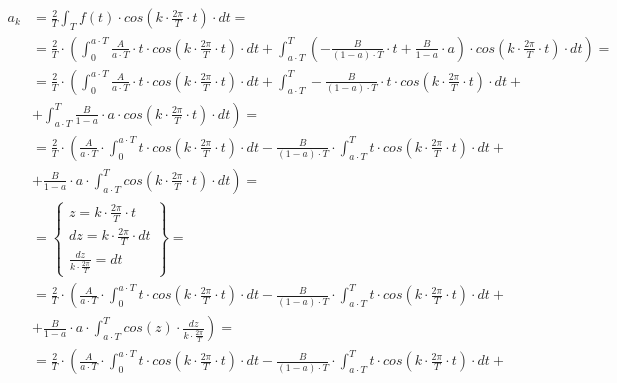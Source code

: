 \begin{task}
\begin{align*}
a_k&=\frac{2}{T}\int_{T}f(t) \cdot cos\left( k \cdot \frac{2\pi}{T} \cdot t\right) \cdot dt=\\
&=\frac{2}{T}\cdot\left(\int_{0}^{a\cdot T} \frac{A}{a \cdot T} \cdot t \cdot cos\left( k \cdot \frac{2\pi}{T} \cdot t\right) \cdot dt+\int_{a \cdot T}^{T} \left(-\frac{B}{\left(1-a\right)\cdot T}\cdot t + \frac{B}{1-a}\cdot a\right) \cdot cos\left( k \cdot \frac{2\pi}{T} \cdot t\right) \cdot dt\right)=\\
&=\frac{2}{T}\cdot\left(\int_{0}^{a\cdot T} \frac{A}{a \cdot T} \cdot t \cdot cos\left( k \cdot \frac{2\pi}{T} \cdot t\right) \cdot dt+\int_{a \cdot T}^{T} -\frac{B}{\left(1-a\right)\cdot T}\cdot t \cdot cos\left( k \cdot \frac{2\pi}{T} \cdot t\right) \cdot dt \right. +\\
&+\left. \int_{a \cdot T}^{T} \frac{B}{1-a}\cdot a \cdot cos\left( k \cdot \frac{2\pi}{T} \cdot t\right) \cdot dt\right)=\\
&=\frac{2}{T}\cdot\left( \frac{A}{a \cdot T} \cdot \int_{0}^{a\cdot T} t \cdot cos\left( k \cdot \frac{2\pi}{T} \cdot t\right) \cdot dt -\frac{B}{\left(1-a\right)\cdot T}\cdot \int_{a \cdot T}^{T} t \cdot cos\left( k \cdot \frac{2\pi}{T} \cdot t\right) \cdot dt \right. +\\
&+\left. \frac{B}{1-a}\cdot a \cdot \int_{a \cdot T}^{T} cos\left( k \cdot \frac{2\pi}{T} \cdot t\right) \cdot dt\right)=\\
&=\left\{\begin{array}{l}
z = k \cdot \frac{2\pi}{T} \cdot t \\
dz = k \cdot \frac{2\pi}{T} \cdot dt \\
\frac{dz}{k \cdot \frac{2\pi}{T}} = dt
\end{array}\right\}=\\
&=\frac{2}{T}\cdot\left( \frac{A}{a \cdot T} \cdot \int_{0}^{a\cdot T} t \cdot cos\left( k \cdot \frac{2\pi}{T} \cdot t\right) \cdot dt -\frac{B}{\left(1-a\right)\cdot T}\cdot \int_{a \cdot T}^{T} t \cdot cos\left( k \cdot \frac{2\pi}{T} \cdot t\right) \cdot dt \right. +\\
&+\left. \frac{B}{1-a}\cdot a \cdot \int_{a \cdot T}^{T} cos\left(z\right) \cdot \frac{dz}{k \cdot \frac{2\pi}{T}}\right)=\\
&=\frac{2}{T}\cdot\left( \frac{A}{a \cdot T} \cdot \int_{0}^{a\cdot T} t \cdot cos\left( k \cdot \frac{2\pi}{T} \cdot t\right) \cdot dt -\frac{B}{\left(1-a\right)\cdot T}\cdot \int_{a \cdot T}^{T} t \cdot cos\left( k \cdot \frac{2\pi}{T} \cdot t\right) \cdot dt \right. +\\

\end{align*}
\end{task}
